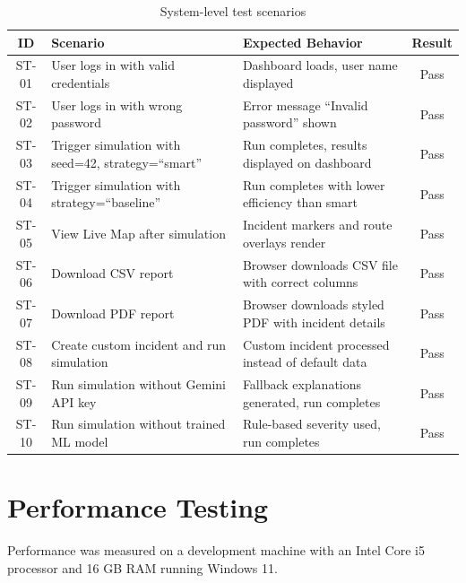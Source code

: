 \begin{table}[H]
\centering
\caption{System-level test scenarios}
\label{tab:system_tests}
\begin{tabularx}{\textwidth}{|c|X|X|c|}
\hline
\textbf{ID} & \textbf{Scenario} & \textbf{Expected Behavior} & \textbf{Result} \\
\hline
ST-01 & User logs in with valid credentials & Dashboard loads, user name displayed & Pass \\
\hline
ST-02 & User logs in with wrong password & Error message ``Invalid password'' shown & Pass \\
\hline
ST-03 & Trigger simulation with seed=42, strategy=``smart'' & Run completes, results displayed on dashboard & Pass \\
\hline
ST-04 & Trigger simulation with strategy=``baseline'' & Run completes with lower efficiency than smart & Pass \\
\hline
ST-05 & View Live Map after simulation & Incident markers and route overlays render & Pass \\
\hline
ST-06 & Download CSV report & Browser downloads CSV file with correct columns & Pass \\
\hline
ST-07 & Download PDF report & Browser downloads styled PDF with incident details & Pass \\
\hline
ST-08 & Create custom incident and run simulation & Custom incident processed instead of default data & Pass \\
\hline
ST-09 & Run simulation without Gemini API key & Fallback explanations generated, run completes & Pass \\
\hline
ST-10 & Run simulation without trained ML model & Rule-based severity used, run completes & Pass \\
\hline
\end{tabularx}
\end{table}

\section{Performance Testing}
\label{sec:performance_testing}

Performance was measured on a development machine with an Intel Core i5 processor and 16 GB RAM running Windows 11.

